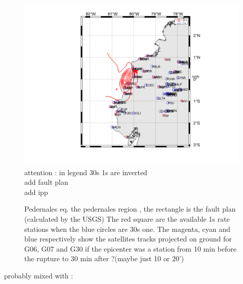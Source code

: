 \documentclass{gji}
\begin{document}
\begin{figure}
\begin{center}
\includegraphics[width=1\linewidth]{images/ped1S30S.png}
attention : in legend 30s 1s are inverted\\
add fault plan \\
add ipp 
\end{center}
\caption{  Pedernales eq. the pedernales region , the rectangle is the fault plan (calculated by the USGS) The red square are the available 1s rate stations when the blue circles are 30s one. The magenta, cyan and blue respectively show the satellites tracks projected on ground for G06, G07 and G30 if the epicenter was a station from 10 min before the rupture to 30 min after ?(maybe just 10 or 20') }
\label{SituationMap}
\end{figure}
probably mixed with :
\end{document}
